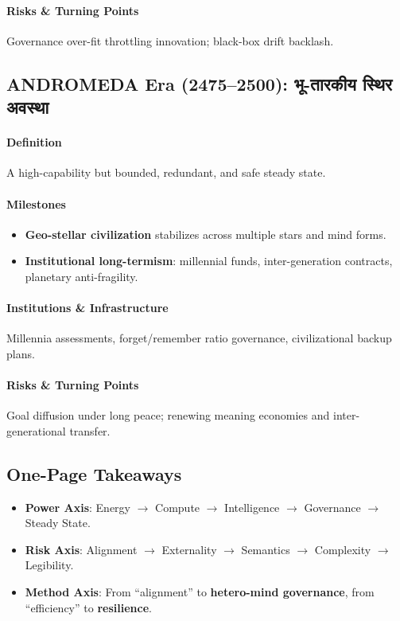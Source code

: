 \documentclass[11pt]{article}
\begin{document}
\begin{itemize}[noitemsep]
\begin{itemize}[noitemsep]
\begin{itemize}[noitemsep]
\begin{itemize}[noitemsep]
\begin{itemize}[noitemsep]
\begin{itemize}[noitemsep]
\paragraph{Risks \& Turning Points} Governance over-fit throttling innovation; black-box drift backlash.

\subsection{ANDROMEDA Era (2475–2500): भू-तारकीय स्थिर अवस्था}
\paragraph{Definition} A high-capability but bounded, redundant, and safe steady state.

\paragraph{Milestones}
\begin{itemize}[noitemsep]
  \item \textbf{Geo-stellar civilization} stabilizes across multiple stars and mind forms.
  \item \textbf{Institutional long-termism}: millennial funds, inter-generation contracts, planetary anti-fragility.
\end{itemize}

\paragraph{Institutions \& Infrastructure} Millennia assessments, forget/remember ratio governance, civilizational backup plans.

\paragraph{Risks \& Turning Points} Goal diffusion under long peace; renewing meaning economies and inter-generational transfer.

\subsection{One-Page Takeaways}
\begin{itemize}[noitemsep]
  \item \textbf{Power Axis}: Energy $\rightarrow$ Compute $\rightarrow$ Intelligence $\rightarrow$ Governance $\rightarrow$ Steady State.
  \item \textbf{Risk Axis}: Alignment $\rightarrow$ Externality $\rightarrow$ Semantics $\rightarrow$ Complexity $\rightarrow$ Legibility.
  \item \textbf{Method Axis}: From ``alignment'' to \textbf{hetero-mind governance}, from ``efficiency'' to \textbf{resilience}.
\end{itemize}


\end{itemize}
\end{itemize}
\end{itemize}
\end{itemize}
\end{itemize}
\end{itemize}
\end{document}
